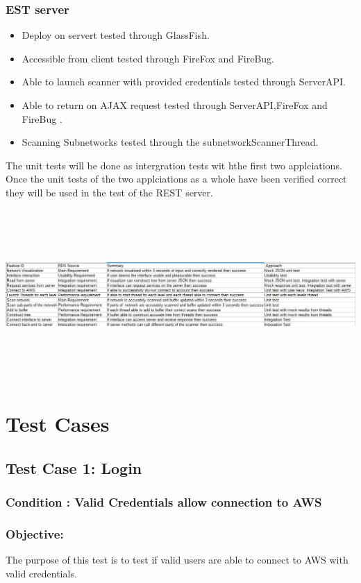 \documentclass[hidelinks,a4paper,12pt]{article}
\begin{document}
\subsubsection{EST server}
\begin{itemize}
  \item Deploy on servert tested through GlassFish.
  \item Accessible from client tested through FireFox and FireBug.
  \item Able to launch scanner with provided credentials tested through ServerAPI.
  \item Able to return on AJAX request tested through ServerAPI,FireFox and FireBug .
   \item Scanning Subnetworks  tested through the subnetworkScannerThread.
\end{itemize}
The unit tests will be done as intergration tests wit hthe first two applciations. Once the unit tests of the two applciations as a whole have been verified correct they will be used in the test of the REST server.

\includegraphics[width=17.3cm,height=6.5cm]{./images/table.jpg}
\newpage
 \section{Test Cases}
\subsection{Test Case 1: Login}
\subsubsection{Condition : Valid Credentials allow connection to AWS}
\subsubsection{Objective:} The purpose of this test is to test if valid users are able to connect to AWS with valid credentials.
\end{document}
